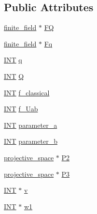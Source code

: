 \subsection*{Public Attributes}
\begin{DoxyCompactItemize}
\item 
\mbox{\hyperlink{classfinite__field}{finite\+\_\+field}} $\ast$ \mbox{\hyperlink{classbuekenhout__metz_a2949842c3c28b19a1abc557c342af377}{FQ}}
\item 
\mbox{\hyperlink{classfinite__field}{finite\+\_\+field}} $\ast$ \mbox{\hyperlink{classbuekenhout__metz_ab26b9a884b3a8fc87cb479ad9ec93da9}{Fq}}
\item 
\mbox{\hyperlink{galois_8h_a09fddde158a3a20bd2dcadb609de11dc}{I\+NT}} \mbox{\hyperlink{classbuekenhout__metz_a925781896188a1d38506cf0df9773fc9}{q}}
\item 
\mbox{\hyperlink{galois_8h_a09fddde158a3a20bd2dcadb609de11dc}{I\+NT}} \mbox{\hyperlink{classbuekenhout__metz_ab86649cd3156aec08f6b3a4b6bccbea8}{Q}}
\item 
\mbox{\hyperlink{galois_8h_a09fddde158a3a20bd2dcadb609de11dc}{I\+NT}} \mbox{\hyperlink{classbuekenhout__metz_a7deb870cccba8d68a5bc547b9dfbe856}{f\+\_\+classical}}
\item 
\mbox{\hyperlink{galois_8h_a09fddde158a3a20bd2dcadb609de11dc}{I\+NT}} \mbox{\hyperlink{classbuekenhout__metz_a8e827f49589c4719bacd4dd5508176a3}{f\+\_\+\+Uab}}
\item 
\mbox{\hyperlink{galois_8h_a09fddde158a3a20bd2dcadb609de11dc}{I\+NT}} \mbox{\hyperlink{classbuekenhout__metz_aaf69f8cadb8202a8db44d65d607a7211}{parameter\+\_\+a}}
\item 
\mbox{\hyperlink{galois_8h_a09fddde158a3a20bd2dcadb609de11dc}{I\+NT}} \mbox{\hyperlink{classbuekenhout__metz_ae192da1019fa9d5200d068903bb4f930}{parameter\+\_\+b}}
\item 
\mbox{\hyperlink{classprojective__space}{projective\+\_\+space}} $\ast$ \mbox{\hyperlink{classbuekenhout__metz_a7a0fb8b05d840da51bed0b49f89f500a}{P2}}
\item 
\mbox{\hyperlink{classprojective__space}{projective\+\_\+space}} $\ast$ \mbox{\hyperlink{classbuekenhout__metz_a4cf3ef82722d04bd2240ea2097367388}{P3}}
\item 
\mbox{\hyperlink{galois_8h_a09fddde158a3a20bd2dcadb609de11dc}{I\+NT}} $\ast$ \mbox{\hyperlink{classbuekenhout__metz_a09ac8f4d307630a5a096fc5472fbaf8d}{v}}
\item 
\mbox{\hyperlink{galois_8h_a09fddde158a3a20bd2dcadb609de11dc}{I\+NT}} $\ast$ \mbox{\hyperlink{classbuekenhout__metz_aedbd8974b4f6435c71f54f930ffd9870}{w1}}

\end{DoxyCompactItemize}
